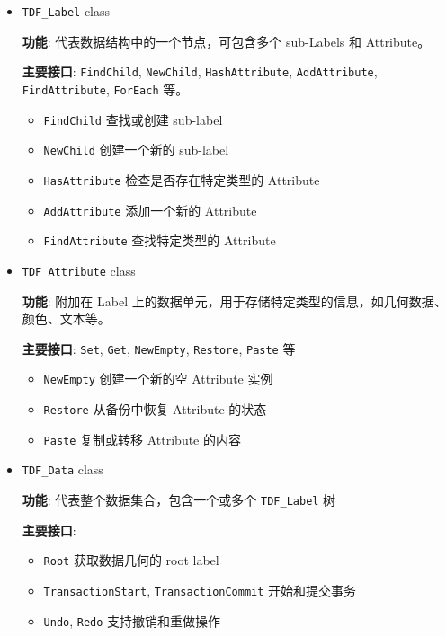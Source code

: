 \documentclass[11pt]{article}
\begin{document}
\begin{itemize}
\item \texttt{TDF\_Label} class

\textbf{功能}: 代表数据结构中的一个节点，可包含多个 sub-Labels 和 Attribute。

\textbf{主要接口}: \texttt{FindChild}, \texttt{NewChild}, \texttt{HashAttribute}, \texttt{AddAttribute}, \texttt{FindAttribute}, \texttt{ForEach} 等。

\begin{itemize}
\item \texttt{FindChild} 查找或创建 sub-label
\item \texttt{NewChild} 创建一个新的 sub-label
\item \texttt{HasAttribute} 检查是否存在特定类型的 Attribute
\item \texttt{AddAttribute} 添加一个新的 Attribute
\item \texttt{FindAttribute} 查找特定类型的 Attribute
\end{itemize}

\item \texttt{TDF\_Attribute} class

\textbf{功能}: 附加在 Label 上的数据单元，用于存储特定类型的信息，如几何数据、颜色、文本等。

\textbf{主要接口}: \texttt{Set}, \texttt{Get}, \texttt{NewEmpty}, \texttt{Restore}, \texttt{Paste} 等

\begin{itemize}
\item \texttt{NewEmpty} 创建一个新的空 Attribute 实例
\item \texttt{Restore} 从备份中恢复 Attribute 的状态
\item \texttt{Paste} 复制或转移 Attribute 的内容
\end{itemize}

\item \texttt{TDF\_Data} class

\textbf{功能}: 代表整个数据集合，包含一个或多个 \texttt{TDF\_Label} 树

\textbf{主要接口}:

\begin{itemize}
\item \texttt{Root} 获取数据几何的 root label
\item \texttt{TransactionStart}, \texttt{TransactionCommit} 开始和提交事务
\item \texttt{Undo}, \texttt{Redo} 支持撤销和重做操作
\end{itemize}


\end{itemize}
\end{document}
